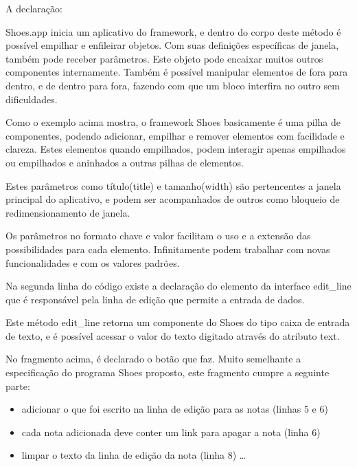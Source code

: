 \documentclass[espaco=simples,appendix=Name]{abnt}
\begin{document}
A declaração:

 

Shoes.app inicia um aplicativo do framework, e dentro do corpo deste método é possível empilhar e enfileirar objetos. Com suas definições específicas de janela, também pode receber parâmetros. Este objeto pode encaixar muitos outros componentes internamente. Também é possível manipular elementos de fora para dentro, e de dentro para fora, fazendo com que um bloco interfira no outro sem dificuldades.

Como o exemplo acima mostra, o framework Shoes basicamente é uma pilha de componentes, podendo adicionar, empilhar e remover elementos com facilidade e clareza. Estes elementos quando empilhados, podem interagir apenas empilhados ou empilhados e aninhados a outras pilhas de elementos. 


 

Estes parâmetros como título(title) e tamanho(width) são pertencentes a janela principal do aplicativo, e podem ser acompanhados de outros como bloqueio de redimensionamento de janela.

Os parâmetros no formato chave e valor facilitam o uso e a extensão das possibilidades para cada elemento. Infinitamente podem trabalhar com novas funcionalidades e com os valores padrões.

Na segunda linha do código existe a declaração do elemento da interface edit\_line que é responsável pela linha de edição que permite a entrada de dados.
 

Este método edit\_line retorna um componente do Shoes do tipo caixa de entrada de texto, e é possível acessar o valor do texto digitado através do atributo text. 

 

No fragmento acima, é declarado o botão que faz. Muito semelhante a especificação do programa Shoes proposto, este fragmento cumpre a seguinte parte: 

\begin{itemize} 
  \item adicionar o que foi escrito na linha de edição para as notas (linhas 5 e 6)
  \item cada nota adicionada deve conter um link para apagar a nota (linha 6)
  \item limpar o texto da linha de edição da nota (linha 8) \ldots
\end{itemize} 
\end{document}
